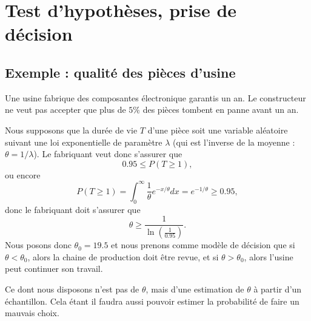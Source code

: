 \section{Test d'hypothèses, prise de décision}

\subsection{Exemple : qualité des pièces d'usine}

Une usine fabrique des composantes électronique garantis un an. Le constructeur ne veut pas accepter que plus de \( 5\%\) des pièces tombent en panne avant un an.

Nous supposons que la durée de vie \( T\) d'une pièce soit une variable aléatoire suivant une loi exponentielle de paramètre \( \lambda\) (qui est l'inverse de la moyenne : \( \theta=1/\lambda\)). Le fabriquant veut donc s'assurer que
\begin{equation}
    0.95\leq P(T\geq 1),
\end{equation}
ou encore
\begin{equation}
    P(T\geq 1)=\int_0^{\infty}\frac{1}{ \theta } e^{-x/\theta}dx= e^{-1/\theta}\geq 0.95,
\end{equation}
donc le fabriquant doit s'assurer que
\begin{equation}
    \theta\geq\frac{1}{ \ln\left( \frac{1}{ 0.95 } \right) }.
\end{equation}
Nous posons donc \( \theta_0=19.5\) et nous prenons comme modèle de décision que si \( \theta<\theta_0\), alors la chaine de production doit être revue, et si \( \theta>\theta_0\), alors l'usine peut continuer son travail.

Ce dont nous disposons n'est pas de \( \theta\), mais d'une estimation de \( \theta\) à partir d'un échantillon. Cela étant il faudra aussi pouvoir estimer la probabilité de faire un mauvais choix.

